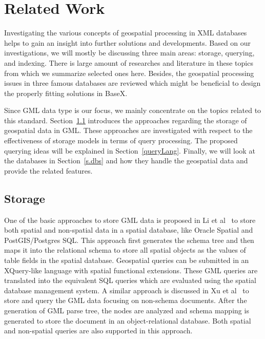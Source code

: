 \documentclass[a4paper,12pt]{article}
\begin{document}
\section{Related Work}
\label{s.rwork}
Investigating the various concepts of geospatial processing in XML databases helps to gain an insight into further solutions and developments. 
Based on our investigations, we will mostly be discussing three main areas: storage, querying, and indexing. There is large amount of researches and literature in these topics from which we summarize selected ones here. Besides, the geospatial processing issues in three famous databases are reviewed which might be beneficial to design the properly fitting solutions in BaseX. %

Since GML data type is our focus, we mainly concentrate on the topics related to this standard. Section~\ref{storage} introduces the approaches regarding the storage of geospatial data in GML. 
These approaches are investigated with respect to the effectiveness of storage models in terms of query processing. The proposed querying ideas will be explained in Section~\ref{queryLang}. 
Finally, we will look at the databases in Section~\ref{s.dbs} and how they handle the geospatial data and provide the related features.
  
\subsection{Storage}
\label{storage}
One of the basic approaches to store GML data is proposed in Li et al~\cite{Li2004} to store both spatial and non-spatial data in a spatial database, like Oracle Spatial and PostGIS/Postgres SQL. This approach first generates the schema tree and then maps it into the relational schema to store all spatial objects as the values of table fields in the spatial database. Geospatial queries can be submitted 
in an XQuery-like language with spatial functional extensions. These GML queries are translated into the equivalent SQL queries which are evaluated using the spatial database management system. 
A similar approach is discussed in Xu et al~\cite{Zhu2011} to store and query the GML data focusing on non-schema documents. After the generation of GML parse tree, the nodes are analyzed and schema mapping is generated to store the document in an object-relational database. 
Both spatial and non-spatial queries are also supported in this approach.
\end{document}
